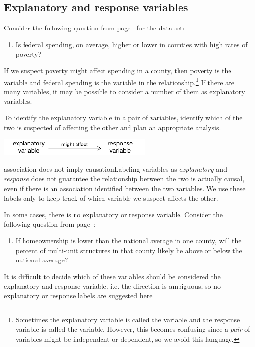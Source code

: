 
\subsection{Explanatory and response variables}
\label{explanatoryAndResponse}


Consider the following question from page~\pageref{fedSpendingPovertyQuestion} for the  data set:
\begin{enumerate}
\item[(1)] 
	Is federal spending, on average, higher or lower in counties with high rates of poverty?
\end{enumerate}
If we suspect poverty might affect spending in a county, then poverty is the  variable and federal spending is the  variable in the relationship.\footnote{Sometimes the explanatory variable is called the  variable and the response variable is called the  variable. However, this becomes confusing since a \emph{pair} of variables might be independent or dependent, so we avoid this language.} If there are many variables, it may be possible to consider a number of them as explanatory variables.

\begin{tipBox}{
To identify the explanatory variable in a pair of variables, identify which of the two is suspected of affecting the other and plan an appropriate analysis.

\hspace{10mm}\includegraphics[height=0.34in]{ch_intro_to_data/figures/expResp/expResp}}
\end{tipBox}

\begin{caution}{association does not imply causation}{Labeling variables as \emph{explanatory} and \emph{response} does not guarantee the relationship between the two is actually causal, even if there is an association identified between the two variables. We use these labels only to keep track of which variable we suspect affects the other.}
\end{caution}

In some cases, there is no explanatory or response variable. Consider the following question from page~\pageref{ownershipMultiUnitQuestion}:
\begin{enumerate}
\item[(2)] 
	If homeownership is lower than the national average in one county, will the percent of multi-unit structures in that county likely be above or below the national average?
\end{enumerate}
It is difficult to decide which of these variables should be considered the explanatory and response variable, i.e. the direction is ambiguous, so no explanatory or response labels are suggested here.


